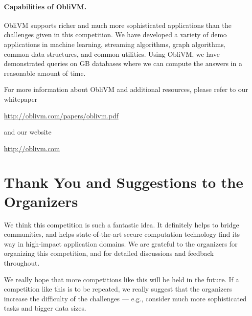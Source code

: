 \documentclass[11pt]{article}
\begin{document}
\paragraph{Capabilities of {\sf ObliVM}.} 
{\sf ObliVM} supports richer and much more sophisticated applications
than the challenges given in this competition.
We have developed a variety of demo applications in machine learning,
streaming algorithms, graph algorithms, 
common data structures, and common utilities.
Using {\sf ObliVM}, we have demonstrated queries on {\sf GB} 
databases where we can compute the answers in a reasonable amount of time. 


\vspace{10pt}
For more information about {\sf ObliVM} and additional resources,
please refer to our whitepaper  

\begin{center}
\url{http://oblivm.com/papers/oblivm.pdf}
\end{center}

and our website 

\begin{center}
\url{http://oblivm.com}
\end{center}


\section{Thank You and Suggestions to the Organizers}
We think this competition is such a fantastic idea. 
It definitely helps to bridge communities, and helps 
state-of-the-art secure computation technology  
find its way in high-impact application domains.
We are grateful to the organizers for organizing this competition,
and for detailed discussions and feedback 
throughout.

We really hope that more competitions like this will be held in the future.
If a competition like this is to be repeated, we really 
suggest that the organizers increase the difficulty 
of the challenges --- e.g., consider much more sophisticated tasks
and bigger data sizes. 
\end{document}

